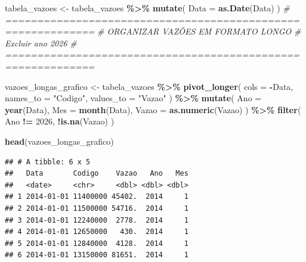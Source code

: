 \documentclass[
]{article}
\newenvironment{Shaded}{\begin{snugshade}}{\end{snugshade}}
\newcommand{\AttributeTok}[1]{\textcolor[rgb]{0.13,0.29,0.53}{#1}}
\newcommand{\CommentTok}[1]{\textcolor[rgb]{0.56,0.35,0.01}{\textit{#1}}}
\newcommand{\DecValTok}[1]{\textcolor[rgb]{0.00,0.00,0.81}{#1}}
\newcommand{\FunctionTok}[1]{\textcolor[rgb]{0.13,0.29,0.53}{\textbf{#1}}}
\newcommand{\NormalTok}[1]{#1}
\newcommand{\OtherTok}[1]{\textcolor[rgb]{0.56,0.35,0.01}{#1}}
\newcommand{\SpecialCharTok}[1]{\textcolor[rgb]{0.81,0.36,0.00}{\textbf{#1}}}
\newcommand{\StringTok}[1]{\textcolor[rgb]{0.31,0.60,0.02}{#1}}
\begin{document}
\begin{Shaded}
\begin{Highlighting}[]
\NormalTok{tabela\_vazoes }\OtherTok{\textless{}{-}}\NormalTok{ tabela\_vazoes }\SpecialCharTok{\%\textgreater{}\%}
  \FunctionTok{mutate}\NormalTok{(}
    \AttributeTok{Data =} \FunctionTok{as.Date}\NormalTok{(Data)}
\NormalTok{  )}
\CommentTok{\# ============================================================}
\CommentTok{\# ORGANIZAR VAZÕES EM FORMATO LONGO}
\CommentTok{\# Excluir ano 2026}
\CommentTok{\# ============================================================}

\NormalTok{vazoes\_longas\_grafico }\OtherTok{\textless{}{-}}\NormalTok{ tabela\_vazoes }\SpecialCharTok{\%\textgreater{}\%}
  \FunctionTok{pivot\_longer}\NormalTok{(}
    \AttributeTok{cols =} \SpecialCharTok{{-}}\NormalTok{Data,}
    \AttributeTok{names\_to =} \StringTok{"Codigo"}\NormalTok{,}
    \AttributeTok{values\_to =} \StringTok{"Vazao"}
\NormalTok{  ) }\SpecialCharTok{\%\textgreater{}\%}
  \FunctionTok{mutate}\NormalTok{(}
    \AttributeTok{Ano =} \FunctionTok{year}\NormalTok{(Data),}
    \AttributeTok{Mes =} \FunctionTok{month}\NormalTok{(Data),}
    \AttributeTok{Vazao =} \FunctionTok{as.numeric}\NormalTok{(Vazao)}
\NormalTok{  ) }\SpecialCharTok{\%\textgreater{}\%}
  \FunctionTok{filter}\NormalTok{(}
\NormalTok{    Ano }\SpecialCharTok{!=} \DecValTok{2026}\NormalTok{,}
    \SpecialCharTok{!}\FunctionTok{is.na}\NormalTok{(Vazao)}
\NormalTok{  )}

\FunctionTok{head}\NormalTok{(vazoes\_longas\_grafico)}
\end{Highlighting}
\end{Shaded}

\begin{verbatim}
## # A tibble: 6 x 5
##   Data       Codigo    Vazao   Ano   Mes
##   <date>     <chr>     <dbl> <dbl> <dbl>
## 1 2014-01-01 11400000 45402.  2014     1
## 2 2014-01-01 11500000 54716.  2014     1
## 3 2014-01-01 12240000  2778.  2014     1
## 4 2014-01-01 12650000   430.  2014     1
## 5 2014-01-01 12840000  4128.  2014     1
## 6 2014-01-01 13150000 81651.  2014     1
\end{verbatim}
\end{document}
